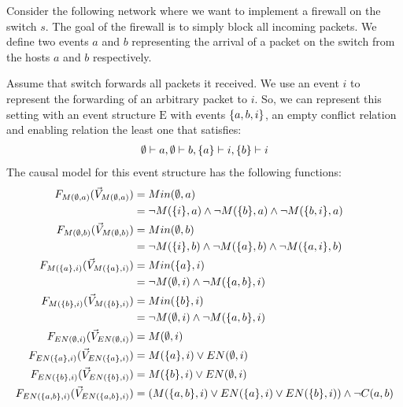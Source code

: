 \begin{example}
    Consider the following network where we want to implement a firewall
    on the switch $s$.
    The goal of the firewall is to simply block all incoming packets.
    We define two events $a$ and $b$ representing the arrival of a packet
    on the switch from the hosts $a$ and $b$ respectively.
    \begin{center}
    \end{center}
    Assume that switch forwards all packets it received.
    We use an event $i$ to represent the forwarding of an arbitrary packet
    to $i$.
    So, we can represent this setting with an event structure $\mathrm{E}$
    with events $\{a,b,i\}$, an empty conflict relation and enabling relation
    the least one that satisfies:
    \begin{align*}
        \emptyset \vdash a, \emptyset \vdash b, \{a\} \vdash i, \{b\} \vdash i
    \end{align*}
    The causal model for this event structure has the following functions:
    \begin{align*}
        F_{M(\emptyset,a)}(\vec V_{M(\emptyset,a)})       & = Min(\emptyset,a)                              \\
                          & = \neg M(\{i\},a) \wedge \neg M(\{b\},a)
        \wedge \neg M(\{b,i\},a)                                     \\
        F_{M(\emptyset,b)}(\vec V_{M(\emptyset,b)})       & = Min(\emptyset,b)                              \\
                          & = \neg M(\{i\},b) \wedge \neg M(\{a\},b)
        \wedge \neg M(\{a,i\},b)                                     \\
        F_{M(\{a\},i)}(\vec V_{M(\{a\},i)})    & = Min(\{a\},i)                           \\
                          & = \neg M(\emptyset,i) \wedge \neg M(\{a,b\},i)  \\
        F_{M(\{b\},i)}(\vec V_{M(\{b\},i)})    & = Min(\{b\},i)                           \\
                          & = \neg M(\emptyset,i) \wedge \neg M(\{a,b\},i)  \\
        F_{EN(\emptyset,i)}(\vec V_{EN(\emptyset,i)})      & = M(\emptyset,i)                                \\
        F_{EN(\{a\},i)}(\vec V_{EN(\{a\},i)})   & = M(\{a\},i) \vee EN(\emptyset,i)               \\
        F_{EN(\{b\},i)}(\vec V_{EN(\{b\},i)})   & = M(\{b\},i) \vee EN(\emptyset,i)               \\
        F_{EN(\{a,b\},i)}(\vec V_{EN(\{a,b\},i)}) & = (M(\{a,b\},i) \vee EN(\{a\},i)
        \vee EN(\{b\},i) ) \wedge \neg C(a,b)                        \\
    \end{align*}



\end{example}